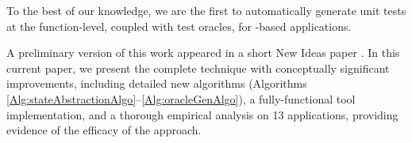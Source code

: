 %
To the best of our knowledge, we are the first to automatically generate unit tests at the function-level, coupled with test oracles, for  \javascript-based applications.

A preliminary version of this work appeared in a short New Ideas paper \cite{shabnam:ase13}. In this current paper, we present the complete technique with conceptually significant improvements, including detailed new algorithms (Algorithms \ref{Alg:stateAbstractionAlgo}--\ref{Alg:oracleGenAlgo}), a fully-functional tool implementation, and a thorough empirical analysis on 13 \javascript applications, providing evidence of the efficacy of the approach.

